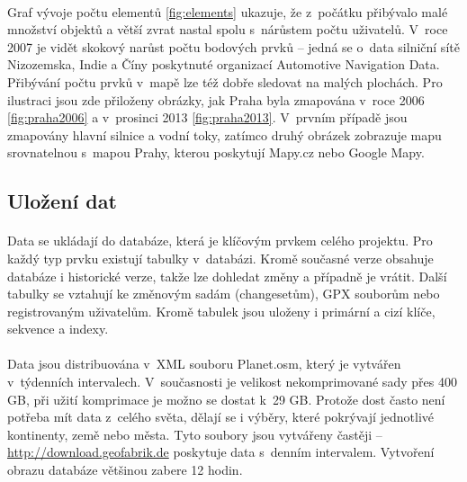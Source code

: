 \documentclass[11pt,a4paper,titlepage,oneside]{book}
\begin{document}

		\paragraph{} Graf vývoje počtu elementů \ref{fig:elements} ukazuje, že z~počátku přibývalo malé množství objektů a větší zvrat nastal spolu s~nárůstem počtu uživatelů. V~roce 2007 je vidět skokový narůst počtu bodových prvků -- jedná se o~data silniční sítě Nizozemska, Indie a Číny poskytnuté organizací Automotive Navigation Data. 
		Přibývání počtu prvků v~mapě lze též dobře sledovat na malých plochách. Pro ilustraci jsou zde přiloženy obrázky, jak Praha byla zmapována v~roce 2006 \ref{fig:praha2006} a v~prosinci 2013 \ref{fig:praha2013}. V~prvním případě jsou zmapovány hlavní silnice a vodní toky, zatímco druhý obrázek zobrazuje mapu srovnatelnou s~mapou Prahy, kterou poskytují Mapy.cz nebo Google Mapy.
	
	\subsection{Uložení dat}
		\paragraph{} Data se ukládají do databáze, která je klíčovým prvkem celého projektu. Pro každý typ prvku existují tabulky v~databázi. Kromě současné verze obsahuje databáze i historické verze, takže lze dohledat změny a případně je vrátit. Další tabulky se vztahují ke změnovým sadám (changesetům), GPX souborům nebo registrovaným uživatelům. Kromě tabulek jsou uloženy i primární a cizí klíče, sekvence a indexy.



		\paragraph{} Data jsou distribuována v~XML souboru Planet.osm, který je vytvářen v~týdenních intervalech. V~současnosti je velikost nekomprimované sady přes 400 GB, při užití komprimace je možno se dostat k~29 GB. Protože dost často není potřeba mít data z~celého světa, dělají se i výběry, které pokrývají jednotlivé kontinenty, země nebo města. Tyto soubory jsou vytvářeny častěji -- \url{http://download.geofabrik.de} poskytuje data s~denním intervalem. Vytvoření obrazu databáze většinou zabere 12 hodin\cite{planet.osm}.
\end{document}
